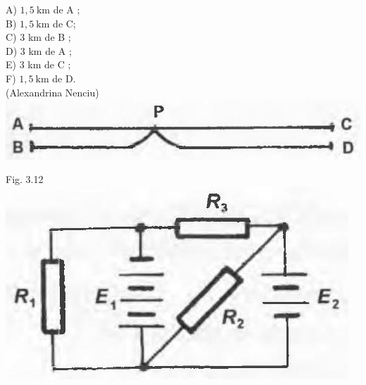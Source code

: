 \documentclass[10pt]{article}
\begin{document}
A) $1,5 \mathrm{~km}$ de A ;\\
B) $1,5 \mathrm{~km}$ de C;\\
C) 3 km de B ;\\
D) 3 km de A ;\\
E) 3 km de C ;\\
F) $1,5 \mathrm{~km}$ de D.\\
(Alexandrina Nenciu)\\
\includegraphics[max width=\textwidth, center]{2025_07_01_5b3ff9fa0d508c8e9f17g-159}

Fig. 3.12\\
\includegraphics[max width=\textwidth, center]{2025_07_01_5b3ff9fa0d508c8e9f17g-159(2)}
\end{document}
